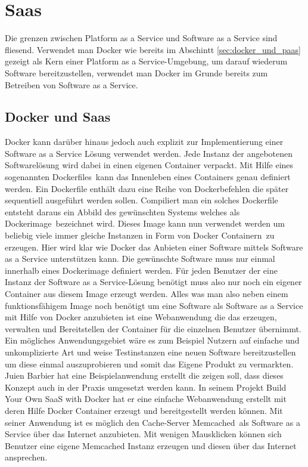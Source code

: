 \section{Saas}
\label{sec:saas}
Die grenzen zwischen Platform as a Service und Software as a Service sind fliesend.
Verwendet man Docker wie bereits im Abschintt \ref{sec:docker_und_paas} gezeigt als Kern einer Platform as a Service-Umgebung, um darauf wiederum Software bereitzustellen, verwendet man Docker im Grunde bereits zum Betreiben von Software as a Service.

\subsection{Docker und Saas}
\label{sec:docker_und_saas}
Docker kann darüber hinaus jedoch auch explizit zur Implementierung einer Software as a Service Lösung verwendet werden. Jede Instanz der angebotenen Softwarelösung wird dabei in einen eigenen Container verpackt. Mit Hilfe eines sogenannten \grq Dockerfiles\grq\ kann das Innenleben eines Containers genau definiert werden. Ein Dockerfile enthält dazu eine Reihe von Dockerbefehlen die später sequentiell ausgeführt werden sollen. Compiliert man ein solches Dockerfile entsteht daraus ein Abbild des gewünschten Systems welches als \grq Dockerimage\grq\ bezeichnet wird.
Dieses Image kann nun verwendet werden um beliebig viele immer gleiche Instanzen in Form von \grq Docker Containern\grq\ zu erzeugen.
Hier wird klar wie Docker das Anbieten einer Software mittels Software as a Service unterstützen kann.
Die gewünschte Software muss nur einmal innerhalb eines Dockerimage definiert werden. Für jeden Benutzer der eine Instanz der Software as a Service-Lösung benötigt muss also nur noch ein eigener Container aus diesem Image erzeugt werden. Alles was man also neben einem funktionsfähigem Image noch benötigt um eine Software als Software as a Service mit Hilfe von Docker anzubieten ist eine Webanwendung die das erzeugen, verwalten und Bereitstellen der Container für die einzelnen Benutzer übernimmt.
Ein mögliches Anwendungsgebiet wäre es zum Beispiel Nutzern auf einfache und unkomplizierte Art und weise Testinstanzen eine neuen Software bereitzustellen um diese einmal auszuprobieren und somit das Eigene Produkt zu vermarkten.
Juien Barbier hat eine Beispielanwendung erstellt die zeigen soll, dass dieses Konzept auch in der Praxis umgesetzt werden kann.
In seinem Projekt \glqq Build Your Own SaaS with Docker\grqq \cite{barbier_build_2013} hat er eine einfache Webanwendung erstellt mit deren Hilfe Docker Container erzeugt und bereitgestellt werden können. Mit seiner Anwendung ist es möglich den Cache-Server \grq Memcached\grq\ als Software as a Service über das Internet anzubieten. Mit wenigen Mausklicken können sich Benutzer eine eigene Memcached Instanz erzeugen und diesen über das Internet ansprechen.
